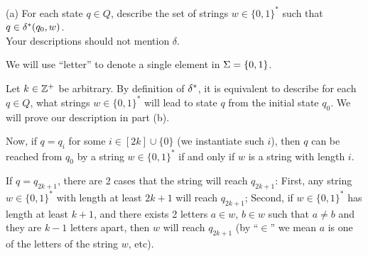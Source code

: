 \documentclass[11pt, sakura, night, 1in]{hw}
\begin{document}

(a) For each state $q \in Q$, describe the set of strings $w \in \{0,1\}^*$ such that $q \in  \delta^*(q_0, w)$.\\
Your descriptions should not mention $\delta$.

 We will use ``letter'' to denote a single element in $\Sigma=\{0,1\}$.

Let $k\in\mathbb{Z}^+$ be arbitrary. By definition of $\delta^*$, it is equivalent to describe for each $q\in Q$, what strings $w\in\{0,1\}^*$ will lead to state $q$ from the initial state $q_0$. We will prove our description in part (b).

Now, if $q=q_i$ for some $i\in[2k]\cup\{0\}$ (we instantiate such $i$), then $q$ can be reached from $q_0$ by a string $w\in\{0,1\}^*$ if and only if $w$ is a string with length $i$.

If $q=q_{2k+1}$, there are 2 cases that the string will reach $q_{2k+1}$: First, any string $w\in\{0,1\}^*$ with length at least $2k+1$ will reach $q_{2k+1}$; Second, if $w\in\{0,1\}^*$ has length at least $k+1$, and there exists 2 letters $a\in w$, $b\in w$ such that $a\ne b$ and they are $k-1$ letters apart, then $w$ will reach $q_{2k+1}$ (by ``$\in$'' we mean $a$ is one of the letters of the string $w$, etc).
\end{document}
